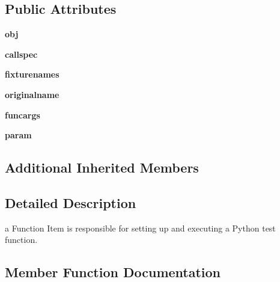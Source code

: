 \subsection*{Public Attributes}
\begin{DoxyCompactItemize}
\item 
\mbox{\label{class__pytest_1_1python_1_1_function_a23e3d6413aa93bcf86adf2250d2fffcb}} 
{\bfseries obj}
\item 
\mbox{\label{class__pytest_1_1python_1_1_function_a5be229fddba4ddb65015b5c5e6b30772}} 
{\bfseries callspec}
\item 
\mbox{\label{class__pytest_1_1python_1_1_function_a61898b6b7f14683168fc41034cab7f97}} 
{\bfseries fixturenames}
\item 
\mbox{\label{class__pytest_1_1python_1_1_function_aa202812c6bf7e931db3f8cf283adcd3a}} 
{\bfseries originalname}
\item 
\mbox{\label{class__pytest_1_1python_1_1_function_a4dfbbcb3f43015ad170eb1cddf46e3a0}} 
{\bfseries funcargs}
\item 
\mbox{\label{class__pytest_1_1python_1_1_function_a2902e9e2118d4c30baf13bbccd52a4e3}} 
{\bfseries param}
\end{DoxyCompactItemize}
\subsection*{Additional Inherited Members}


\subsection{Detailed Description}
\begin{DoxyVerb}a Function Item is responsible for setting up and executing a
Python test function.
\end{DoxyVerb}
 

\subsection{Member Function Documentation}
\mbox{\label{class__pytest_1_1python_1_1_function_af111099922380430d9eb9f04fe2a4ccc}} 
